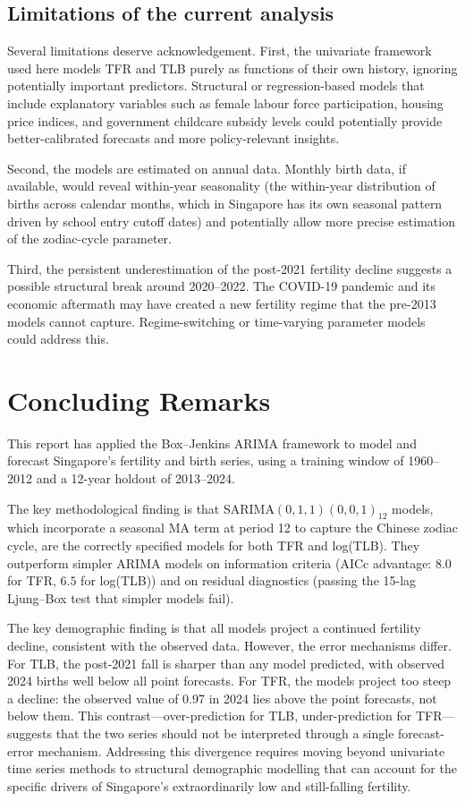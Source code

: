 \documentclass[12pt,a4paper]{article}
\begin{document}
\subsection{Limitations of the current analysis}

Several limitations deserve acknowledgement. First, the univariate framework used here
models TFR and TLB purely as functions of their own history, ignoring potentially
important predictors. Structural or regression-based models that include explanatory
variables such as female labour force participation, housing price indices, and
government childcare subsidy levels could potentially provide better-calibrated
forecasts and more policy-relevant insights.

Second, the models are estimated on annual data. Monthly birth data, if available,
would reveal within-year seasonality (the within-year distribution of births across
calendar months, which in Singapore has its own seasonal pattern driven by school
entry cutoff dates) and potentially allow more precise estimation of the zodiac-cycle
parameter.

Third, the persistent underestimation of the post-2021 fertility decline suggests
a possible structural break around 2020--2022. The COVID-19 pandemic and its
economic aftermath may have created a new fertility regime that the pre-2013 models
cannot capture. Regime-switching or time-varying parameter models could address this.

\section{Concluding Remarks}
\label{sec:conc}

This report has applied the Box--Jenkins ARIMA framework to model and forecast
Singapore's fertility and birth series, using a training window of 1960--2012 and a
12-year holdout of 2013--2024.

The key methodological finding is that SARIMA$(0,1,1)(0,0,1)_{12}$ models, which
incorporate a seasonal MA term at period 12 to capture the Chinese zodiac cycle, are
the correctly specified models for both TFR and log(TLB). They outperform simpler
ARIMA models on information criteria (AICc advantage: $8.0$ for TFR, $6.5$ for log(TLB)) and on
residual diagnostics (passing the 15-lag Ljung--Box test that simpler models fail).

The key demographic finding is that all models project a continued fertility decline,
consistent with the observed data. However, the error mechanisms differ. For TLB, the post-2021 fall is sharper than
any model predicted, with observed 2024 births well below all point forecasts.
For TFR, the models project too steep a decline: the observed value of 0.97 in 2024
lies above the point forecasts, not below them. This contrast---over-prediction for
TLB, under-prediction for TFR---suggests that the two series should not be
interpreted through a single forecast-error mechanism. Addressing this divergence
requires moving beyond univariate time series methods to structural demographic
modelling that can account for the specific drivers of Singapore's extraordinarily
low and still-falling fertility.
\end{document}
